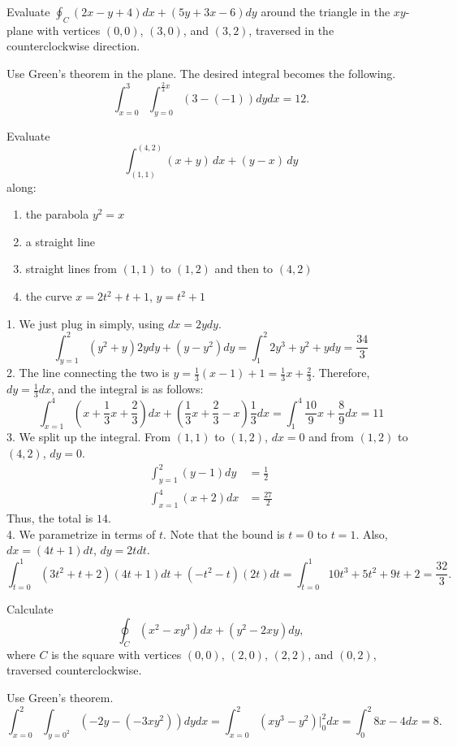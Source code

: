 \begin{exercise}
Evaluate $\oint_C (2x-y+4) dx+(5y+3x-6) dy$ around the triangle in the $xy$-plane with 
vertices $(0,0)$, $(3,0)$, and $(3,2)$, traversed in the counterclockwise direction.
\end{exercise}
\begin{solution}
Use Green's theorem in the plane. The desired integral becomes the following.
\[
\int_{x = 0}^3 \int_{y = 0}^{\frac{2}{3}x} (3 - (-1)) dydx
= 12.
\]
\end{solution}

\begin{exercise}
Evaluate
\[
\int_{(1,1)}^{(4,2)} (x+y)\,dx+(y-x)\,dy
\]
along:
\begin{enumerate}
\item the parabola $y^2=x$
\item a straight line
\item straight lines from $(1,1)$ to $(1,2)$ and then to $(4,2)$
\item the curve $x=2t^2+t+1$, $y=t^2+1$
\end{enumerate}
\end{exercise}
\begin{solution}
1. We just plug in simply, using $dx = 2ydy$.
\[
\int_{y = 1}^2 (y^2 + y)2ydy + (y - y^2)dy
= \int_1^2 2y^3 + y^2 + y dy 
= \frac{34}{3}
\]
2. The line connecting the two is $y = \frac{1}{3}(x - 1) + 1 = \frac{1}{3}x + \frac{2}{3}$.
Therefore, $dy = \frac{1}{3} dx$, and the integral is as follows:
\[
\int_{x = 1}^4 (x + \frac{1}{3}x + \frac{2}{3}) dx + (\frac{1}{3}x + \frac{2}{3} - x) \frac{1}{3}dx
= \int_{1}^4 \frac{10}{9}x + \frac{8}{9} dx
= 11
\]
3. We split up the integral. From $(1,1)$ to $(1,2)$, $dx = 0$ and from $(1,2)$
to $(4,2)$, $dy = 0$.
\begin{align*}
\int_{y = 1}^2 (y - 1)dy &= \frac{1}{2} \\
\int_{x = 1}^4 (x + 2)dx &= \frac{27}{2}
\end{align*}
Thus, the total is $14$. \\

4. We parametrize in terms of $t$. Note that the bound is $t = 0$ to $t = 1$.
Also, $dx = (4t + 1)dt$, $dy = 2t dt$.
\[
\int_{t = 0}^1 (3t^2 + t + 2)(4t + 1)dt + (-t^2 - t)(2t)dt
= \int_{t = 0}^1 10t^3 + 5t^2 + 9t + 2
= \frac{32}{3}.
\]
\end{solution}

\begin{exercise}
Calculate
\[
\oint_C (x^2-xy^3) dx+(y^2-2xy) dy,
\]
where $C$ is the square with vertices $(0,0)$, $(2,0)$, $(2,2)$, and $(0,2)$, 
traversed counterclockwise.
\end{exercise}
\begin{solution}
Use Green's theorem.
\[
\int_{x = 0}^2 \int_{y = 0^2} (-2y - (-3xy^2))dydx
= \int_{x = 0}^2 (xy^3 - y^2) \bigg|_0^2 dx
= \int_0^2 8x - 4 dx 
= 8.
\]
\end{solution}

